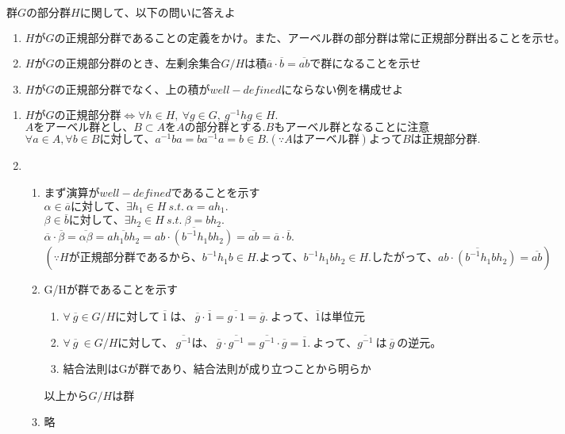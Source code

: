 \documentclass[dvipdfmx]{jsarticle}
\begin{document}
\begin{tcolorbox}[colframe=black!50,colback=white,colbacktitle=black!50,coltitle=white,fonttitle=\bfseries\sffamily,title=問題2]
  $群Gの部分群Hに関して、以下の問いに答えよ$
  \begin{enumerate}
    \item $HがGの正規部分群であることの定義をかけ。また、アーベル群の部分群は常に正規部分群出ることを示せ。$
    \item $HがGの正規部分群のとき、左剰余集合G/Hは積\overline{a} \cdot \overline{b} = \overline{ab}で群になることを示せ$
    \item $HがGの正規部分群でなく、上の積がwell-definedにならない例を構成せよ$
  \end{enumerate}

\end{tcolorbox}

\begin{enumerate}
  \item $HがGの正規部分群 \Leftrightarrow \forall h \in H, \  \forall g \in G, \  g^{-1}hg \in H.$ \\
  $Aをアーベル群とし、B \subset AをAの部分群とする.Bもアーベル群となることに注意$\\
  $\forall a \in A, \forall b \in Bに対して、a^{-1}ba = ba^{-1}a = b \in B.(\because Aはアーベル群)よってBは正規部分群.$
  \item　
  \begin{enumerate}
    \item $まず演算がwell-definedであることを示す$\\
    $\alpha \in \overline{a}に対して、\exists h_1 \in H \ s.t. \  \alpha = ah_1.$ \ $\beta \in \overline{b}に対して、\exists h_2 \in H \ s.t. \  \beta = bh_2.$\\
    $\overline{\alpha} \cdot \overline{\beta} = \overline{\alpha \beta} = \overline{ah_1bh_2} = \overline{ab \cdot (b^{-1}h_1bh_2)} = \overline{ab} = \overline{a} \cdot \overline{b}.$\\
    $(\because Hが正規部分群であるから、b^{-1}h_1b \in H.よって、b^{-1}h_1bh_2 \in H.したがって、\overline{ab \cdot (b^{-1}h_1bh_2)}=\overline{ab})$

    \item G/Hが群であることを示す
    \begin{enumerate}
      \item $\forall \ \overline{g} \in G/Hに対して \  \overline{1} \ は、 \ \overline{g} \cdot \overline{1} = \overline{g \cdot 1} = \overline{g}. \ よって、\overline{1}は単位元$

      \item $\forall \  \overline{g} \ \in G/Hに対して、\ \overline{g^{-1}}は、 \ \overline{g} \cdot \overline{g^{-1}} = \overline{g^{-1}} \cdot \overline{g} = \overline{1}. \ よって、\overline{g^{-1}} \ は \ \overline{g} \ の逆元。$

      \item 結合法則はGが群であり、結合法則が成り立つことから明らか
    \end{enumerate}
    以上から$G/Hは群$

    \item 略
  \end{enumerate}
\end{enumerate}
\end{document}

